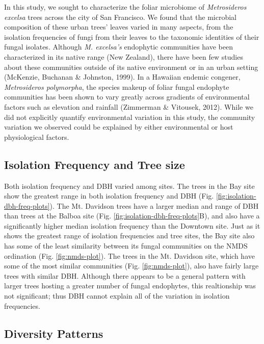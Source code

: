 \documentclass[fleqn,10pt,lineno]{wlpeerj} %
\begin{document}
In this study, we sought to characterize the foliar microbiome of \emph{Metrosideros excelsa} trees across the city of San Francisco. We found that the microbial composition of these urban trees' leaves varied in many aspects, from the isolation frequencies of fungi from their leaves to the taxonomic identities of their fungal isolates. Although \emph{M. excelsa's} endophytic communities have been characterized in its native range (New Zealand), there have been few studies about these communities outside of its native environment or in an urban setting (McKenzie, Buchanan \& Johnston, 1999). In a Hawaiian endemic congener, \emph{Metrosideros polymorpha}, the species makeup of foliar fungal endophyte communities has been shown to vary greatly across gradients of environmental factors such as elevation and rainfall (Zimmerman \& Vitousek, 2012). While we did not explicitly quantify environmental variation in this study, the community variation we observed could be explained by either environmental or host physiological factors.

\hypertarget{isolation-frequency-and-tree-size}{%
\subsection*{Isolation Frequency and Tree size}\label{isolation-frequency-and-tree-size}}

Both isolation frequency and DBH varied among sites. The trees in the Bay site show the greatest range in both isolation frequency and DBH (Fig. \ref{fig:isolation-dbh-freq-plots}). The Mt. Davidson trees have a larger median and range of DBH than trees at the Balboa site (Fig. \ref{fig:isolation-dbh-freq-plots}B), and also have a significantly higher median isolation frequency than the Downtown site. Just as it shows the greatest range of isolation frequencies and tree sites, the Bay site also has some of the least similarity between its fungal communities on the NMDS ordination (Fig. \ref{fig:nmds-plot}). The trees in the Mt. Davidson site, which have some of the most similar communities (Fig. \ref{fig:nmds-plot}), also have fairly large trees with similar DBH. Although there appears to be a general pattern with larger trees hosting a greater number of fungal endophytes, this realtionship was not significant; thus DBH cannot explain all of the variation in isolation frequencies.

\hypertarget{diversity-patterns-1}{%
\subsection*{Diversity Patterns}\label{diversity-patterns-1}}
\end{document}
